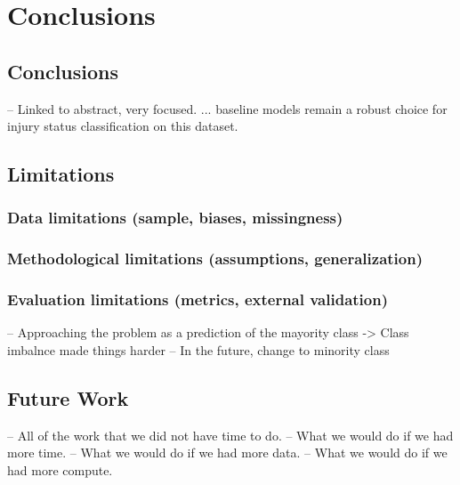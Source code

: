 \chapter{Conclusions}\label{chap:conclusions}

\section{Conclusions}\label{sec:conc-conclusions}
-- Linked to abstract, very focused.
... baseline models remain a robust choice for injury status classification on this dataset.

\section{Limitations}\label{sec:conc-limitations}

\subsection{Data limitations (sample, biases, missingness)}\label{sec:limitations-data}

\subsection{Methodological limitations (assumptions, generalization)}\label{sec:limitations-methods}

\subsection{Evaluation limitations (metrics, external validation)}\label{sec:limitations-evaluation}
-- Approaching the problem as a prediction of the mayority class -> Class imbalnce made things harder
    -- In the future, change to minority class

\section{Future Work}\label{sec:conc-future-work}
-- All of the work that we did not have time to do.
-- What we would do if we had more time.
-- What we would do if we had more data.
-- What we would do if we had more compute.